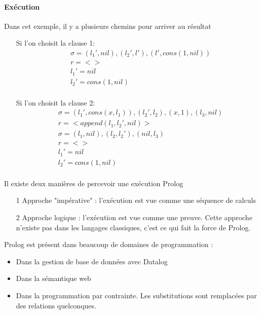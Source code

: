 \paragraph{Exécution}
Dans cet exemple, il y a plusieurs chemins pour arriver au résultat
\begin{itemize}
\item[] Si l'on choisit la clause 1: 
\begin{align*}
&\sigma = {(l_{1}',nil), (l_{2}',l'), (l',cons(1,nil))} \\
&r= < > \\
& l_{1}'=nil \\
& l_{2}'=cons(1,nil) \\
\end{align*}

\item[] Si l'on choisit la clause 2: 
\begin{align*}
&\sigma = {(l_{1}',cons(x,l_{1})), (l_{2}',l_{2}), (x,1), (l_{3},nil)} \\
&r= < append(l_{1},l_{2}',nil) > \\
&\sigma = {(l_{1},nil), (l_{2},l_{2}'), (nil,l_{3})} \\
&r= < > \\
& l_{1}'=nil \\
& l_{2}'=cons(1,nil) \\
\end{align*}

\end{itemize}


Il existe deux manières de percevoir une exécution Prolog

\begin{itemize}
\item[1] Approche "impérative" : l'exécution est vue comme une séquence de calculs
\item[2] Approche logique : l'exécution est vue comme une preuve. Cette approche n'existe pas dans les langages classiques, c'est ce qui fait la force de Prolog.
\end{itemize}

Prolog est présent dans beaucoup de domaines de programmation :

\begin{itemize}
\item Dans la gestion de base de données avec Datalog
\item Dans la sémantique web
\item Dans la programmation par contrainte. Les substitutions sont remplacées par des relations quelconques.
\end{itemize}

